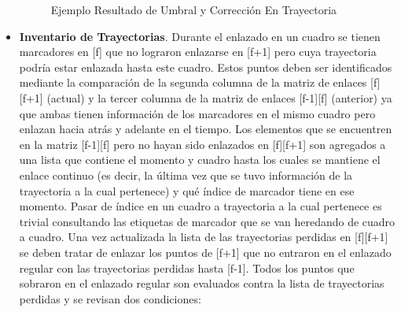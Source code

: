 \begin{itemize}
\begin{figure}[H]
 \centering
 \caption{Ejemplo Resultado de Umbral y Corrección En Trayectoria}
\label{distro_acc_track_m13_fix}
\end{figure}
\item \textbf{Inventario de Trayectorias}. Durante el enlazado en un cuadro se tienen marcadores en [f] que no lograron enlazarse en [f+1] pero cuya trayectoria podría estar enlazada hasta este cuadro.
Estos puntos deben ser identificados mediante la comparación de la segunda columna de la matriz de enlaces [f][f+1] (actual) y la tercer columna de la matriz de enlaces [f-1][f] (anterior) ya que ambas tienen información de los marcadores en el mismo cuadro pero enlazan hacia atrás y adelante en el tiempo.
Los elementos que se encuentren en la matriz [f-1][f] pero no hayan sido enlazados en [f][f+1] son agregados a una lista que contiene el momento y cuadro hasta los cuales se mantiene el enlace continuo (es decir, la última vez que se tuvo información de la trayectoria a la cual pertenece) y qué índice de marcador tiene en ese momento. Pasar de índice en un cuadro a trayectoria a la cual pertenece es trivial consultando las etiquetas de marcador que se van heredando de cuadro a cuadro.
Una vez actualizada la lista de las trayectorias perdidas en [f][f+1] se deben tratar de enlazar los puntos de [f+1] que no entraron en el enlazado regular con las trayectorias perdidas hasta [f-1]. Todos los puntos que sobraron en el enlazado regular son evaluados contra la lista de trayectorias perdidas y se revisan dos condiciones:


\end{itemize}
